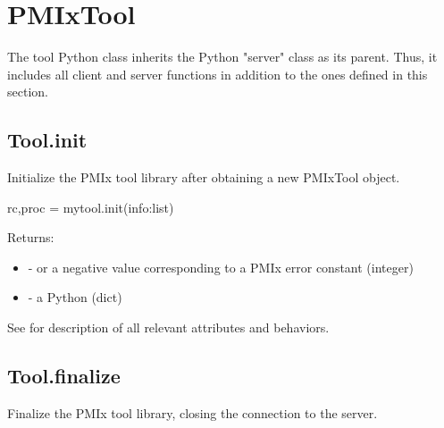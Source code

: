 \section{PMIxTool}
\label{app:python:tool}

The tool Python class inherits the Python "server" class as its parent. Thus, it includes all client and server functions in addition to the ones defined in this section.


\subsection{Tool.init}

\summary

Initialize the \ac{PMIx} tool library after obtaining a new PMIxTool object.

\format

\pyspecificstart
\begin{codepar}
rc,proc = mytool.init(info:list)
\end{codepar}
\pyspecificend


\begin{arglist}
\end{arglist}

Returns:

\begin{itemize}
    \item {} -  or a negative value corresponding to a PMIx error constant (integer)
    \item {} - a Python  (dict)
\end{itemize}

See  for description of all relevant attributes and behaviors.


\subsection{Tool.finalize}

\summary

Finalize the PMIx tool library, closing the connection to the server.

